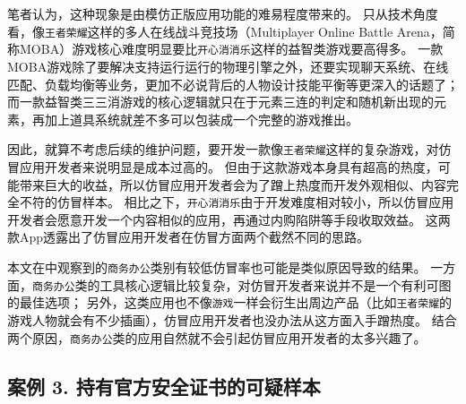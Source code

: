 笔者认为，这种现象是由模仿正版应用功能的难易程度带来的。
只从技术角度看，像\texttt{王者荣耀}这样的多人在线战斗竞技场（Multiplayer Online Battle Arena，简称MOBA）游戏核心难度明显要比\texttt{开心消消乐}这样的益智类游戏要高得多。
一款MOBA游戏除了要解决支持运行运行的物理引擎之外，还要实现聊天系统、在线匹配、负载均衡等业务，更加不必说背后的人物设计技能平衡等更深入的话题了；而一款益智类三三消游戏的核心逻辑就只在于元素三连的判定和随机新出现的元素，再加上道具系统就差不多可以包装成一个完整的游戏推出。

因此，就算不考虑后续的维护问题，要开发一款像\texttt{王者荣耀}这样的复杂游戏，对仿冒应用开发者来说明显是成本过高的。
但由于这款游戏本身具有超高的热度，可能带来巨大的收益，所以仿冒应用开发者会为了蹭上热度而开发外观相似、内容完全不符的仿冒样本。
相比之下，\texttt{开心消消乐}由于开发难度相对较小，所以仿冒应用开发者会愿意开发一个内容相似的应用，再通过内购陷阱等手段收取效益。
这两款App透露出了仿冒应用开发者在仿冒方面两个截然不同的思路。

本文在中观察到的\texttt{商务办公}类别有较低仿冒率也可能是类似原因导致的结果。
一方面，\texttt{商务办公}类的工具核心逻辑比较复杂，对仿冒开发者来说并不是一个有利可图的最佳选项；
另外，这类应用也不像\texttt{游戏}一样会衍生出周边产品（比如\texttt{王者荣耀}的游戏人物就会有不少插画），仿冒应用开发者也没办法从这方面入手蹭热度。
结合两个原因，\texttt{商务办公}类的应用自然就不会引起仿冒应用开发者的太多兴趣了。

\subsection{案例 3. 持有官方安全证书的可疑样本}

